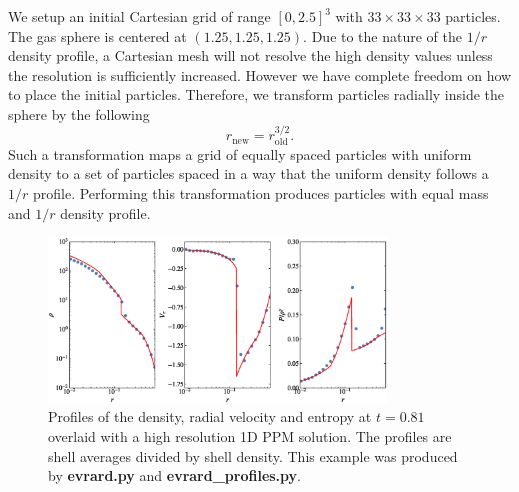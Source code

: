 We setup an initial Cartesian grid of range $[0,2.5]^3$ with $33\times33\times33$ particles.
The gas sphere is centered at $(1.25, 1.25, 1.25)$. Due to the nature of the $1/r$ density profile,
a Cartesian mesh will not resolve the high density values unless the resolution is sufficiently 
increased. However we have complete freedom on how to place the initial particles. Therefore, we 
transform particles radially inside the sphere by the following
\begin{equation}
    r_{\mathrm{new}} = r_{\mathrm{old}}^{3/2}.
\end{equation}
Such a transformation maps a grid of equally spaced particles with uniform density to
a set of particles spaced in a way that the uniform density follows a $1/r$ profile.
Performing this transformation produces particles with equal mass and $1/r$ density profile.
\begin{figure}
    \begin{center}
        \includegraphics[width=0.8\textwidth]{figures/evrard.eps}
        \caption{Profiles of the density, radial velocity and entropy at $t=0.81$ overlaid
        with a high resolution 1D PPM solution. The profiles are shell averages divided by 		
        shell density. This example was produced by \textbf{evrard.py} and 
        \textbf{evrard\_profiles.py}.}
        \label{fig.evrard}
    \end{center}
\end{figure}

